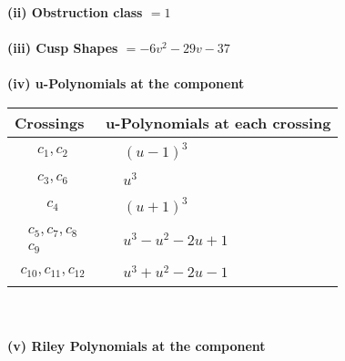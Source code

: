 \documentclass[1p]{elsarticle_modified}
\theoremstyle{definition}
\begin{document}
\flushleft \textbf{(ii) Obstruction class $= 1$}\\~\\
\flushleft \textbf{(iii) Cusp Shapes $= -6 v^2-29 v-37$}\\~\\
\newpage\renewcommand{\arraystretch}{1}
\flushleft \textbf{(iv) u-Polynomials at the component}\newline \\
\begin{tabular}{m{50pt}|m{274pt}}
Crossings & \hspace{64pt}u-Polynomials at each crossing \\
\hline $$\begin{aligned}c_{1},c_{2}\end{aligned}$$&$\begin{aligned}
&(u-1)^3
\end{aligned}$\\
\hline $$\begin{aligned}c_{3},c_{6}\end{aligned}$$&$\begin{aligned}
&u^3
\end{aligned}$\\
\hline $$\begin{aligned}c_{4}\end{aligned}$$&$\begin{aligned}
&(u+1)^3
\end{aligned}$\\
\hline $$\begin{aligned}c_{5},c_{7},c_{8}\\c_{9}\end{aligned}$$&$\begin{aligned}
&u^3- u^2-2 u+1
\end{aligned}$\\
\hline $$\begin{aligned}c_{10},c_{11},c_{12}\end{aligned}$$&$\begin{aligned}
&u^3+u^2-2 u-1
\end{aligned}$\\
\hline
\end{tabular}\\~\\
\newpage\renewcommand{\arraystretch}{1}
\flushleft \textbf{(v) Riley Polynomials at the component}\newline \\
\end{document}
